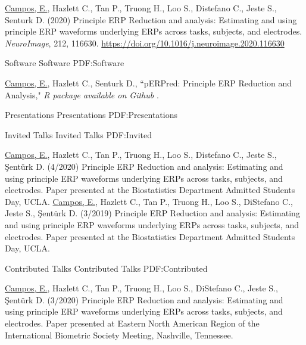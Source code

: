 \documentclass[letterpaper,MMMyyyy,nonstopmode]{simpleresumecv}
\begin{document}
\begin{Body}
\begingroup
\renewcommand{\MaxNumberedItem}{[88]}

\BigGap
\BulletItem
\underline{Campos, E.}, Hazlett C., Tan P., Truong H., Loo S., Distefano C., Jeste S., Senturk D. (2020) Principle ERP Reduction and analysis: Estimating and using principle ERP waveforms underlying ERPs across tasks, subjects, and electrodes. \textit{NeuroImage}, 212, 116630. \href{https://doi.org/10.1016/j.neuroimage.2020.116630}{\url{https://doi.org/10.1016/j.neuroimage.2020.116630}}

\endgroup

\BigGap
\SubSection
{Software}
{Software}
{PDF:Software}

\begingroup
\renewcommand{\MaxNumberedItem}{[8888]}

\BigGap
\BulletItem
\underline{Campos, E.}, Hazlett C., Senturk D., ``pERPred:  Principle ERP Reduction and Analysis," \textit{R package available on Github} .


\endgroup


\Section
{Presentations}
{Presentations}
{PDF:Presentations}

\SubSection
{Invited Talks}
{Invited Talks}
{PDF:Invited}


\BigGap
\BulletItem 
\underline{Campos, E.}, Hazlett C., Tan P., Truong H., Loo S., Distefano C., Jeste S., \c{S}ent\"{u}rk D. (4/2020) Principle ERP Reduction and analysis: Estimating and using principle ERP waveforms underlying ERPs across tasks, subjects, and electrodes. Paper presented at the Biostatistics Department Admitted Students Day, UCLA.
\BigGap
\BulletItem
\underline{Campos, E.}, Hazlett C., Tan P., Truong H., Loo S., DiStefano C., Jeste S., \c{S}ent\"{u}rk D. (3/2019) Principle ERP Reduction and analysis: Estimating and using principle ERP waveforms underlying ERPs across tasks, subjects, and electrodes. Paper presented at the Biostatistics Department Admitted Students Day, UCLA.


\newpage 

\BigGap
\SubSection
{Contributed Talks}
{Contributed Talks}
{PDF:Contributed}

\BigGap
\BulletItem
\underline{Campos, E.}, Hazlett C., Tan P., Truong H., Loo S., DiStefano C., Jeste S., \c{S}ent\"{u}rk D. (3/2020) Principle ERP Reduction and analysis: Estimating and using principle ERP waveforms underlying ERPs across tasks, subjects, and electrodes. Paper presented at Eastern North American Region of the International Biometric Society Meeting, Nashville, Tennessee.



\end{Body}
\end{document}

